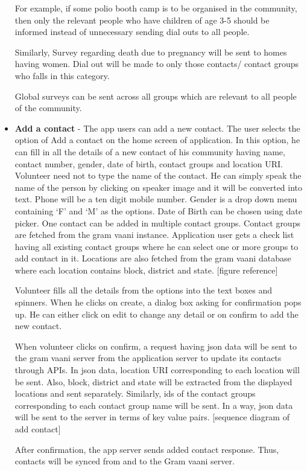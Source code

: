 \begin{itemize}
For example, if some polio booth camp is to be organised in the community, then only the relevant people who have children of age 3-5 should be informed instead of unnecessary sending dial outs to all people.

Similarly, Survey regarding death due to pregnancy will be sent to homes having women. Dial out will be made to only those contacts/ contact groups who falls in this category. 

Global surveys can be sent across all groups which are relevant to all people of the community.

 \item \textbf {Add a contact} - The app users can add a new contact. The user selects the option of Add a contact on the  home screen of application. In this option, he can fill in all the details of a new contact of his community having name, contact number, gender, date of birth, contact groups and location URI. Volunteer need not to type the name of the contact. He can simply speak the name of the person by clicking on speaker image and it will be converted into text. Phone will be a ten digit mobile number. Gender is a drop down menu containing ‘F’ and ‘M’ as the options. Date of Birth can be chosen using date picker. One contact can be added in multiple  contact groups. Contact groups are fetched from the gram vaani instance. Application user gets a check list having all existing contact groups where he can select one or more groups to add contact in it. Locations are also fetched from the gram vaani database where each location contains block, district and state. [figure reference]

Volunteer fills all the details from the options into the text boxes and spinners. When he clicks on create, a dialog box asking for confirmation pops up. He can either click on edit to change any detail or on confirm to add the new contact.

When volunteer clicks on confirm, a request having json data will be sent to the  gram vaani server from the application server to update its contacts through APIs. In json data, location URI corresponding to each location will be sent. Also, block, district and state will be extracted from the displayed locations and sent separately. Similarly, ids of the contact groups corresponding to each contact group name will be sent. In a way, json data will be sent to the server in terms of key value pairs. [sequence diagram of add contact]

 After confirmation, the app server sends added contact response. Thus, contacts will be synced from and to the Gram vaani server.


\end{itemize}
